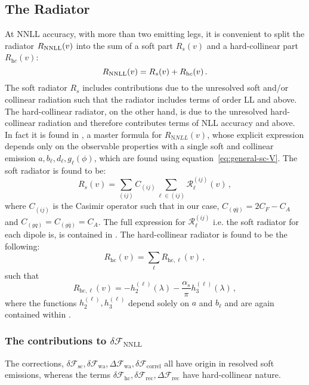 \subsection{The Radiator}
\label{sec: radiator}
At NNLL accuracy, with more than two emitting legs, it is convenient
to split the radiator $R_{\text{NNLL}}(v)$ into the sum of a soft part $R_s(v)$ and a hard-collinear part $R_{\mathrm hc}(v)$:
\begin{equation}
  \label{eq:nnll-radiator}
  R_{\text{NNLL}}(v) = R_s(v)+R_{\mathrm hc}(v)\,.
\end{equation}
The soft radiator $R_s$ includes contributions due to the unresolved soft and/or collinear radiation such that the radiator includes terms of order LL and above. The hard-collinear radiator, on the other hand, is due to the unresolved hard-collinear radiation and therefore contributes terms of NLL accuracy and above. In fact it is found in \cite{Arpino:2019ozn}, a master formula for  $R_{\mathrm NNLL}(v)$, whose explicit expression depends only on the observable properties with a single soft and collinear emission $a,b_\ell,d_\ell,g_\ell(\phi)$, which are found using equation~\ref{eq:general-sc-V}. The soft radiator is found to be:
\begin{equation}
R_s(v)=\sum_{(ij)}C_{(ij)}\sum_{\ell\in(ij)}\mathcal{R}_{\ell}^{(ij)}(v)\,,
\label{eq:soft-radiator}
\end{equation}
where $C_{(ij)}$ is the Casimir operator 
such that in our case, $C_{(q\bar{q})}=2C_F-C_A$ and $C_{(gq)}=C_{(g\bar{q})}=C_A$. The full expression for $\mathcal{R}_{\ell}^{(ij)}$ i.e. the soft radiator for each dipole is, is contained in \cite{Arpino:2019ozn}.
The hard-collinear radiator is found to be the following:
\begin{equation}
	R_{\mathrm{hc}}(v)=\sum_{\ell}R_{\mathrm{hc},\ell}(v)\,,
	\label{eq:radiator-hc}
\end{equation}
such that
\begin{equation}
	R_{\mathrm{hc},\ell}(v)=-h_2^{(\ell)}(\lambda)-\frac{\alpha_s}{\pi}h_3^{(\ell)}(\lambda)\,,
	\label{eq:radiator-hc-more}
\end{equation}
where the functions $h_2^{(\ell)}, h_3^{(\ell)}$ depend solely on $a$ and $b_{\ell}$ and are again contained within \cite{Arpino:2019ozn}.

\subsubsection{The contributions to $\delta\mathcal{F}_{\mathrm{NNLL}}$}
The corrections, $\delta\mathcal{F}_{\mathrm{sc}}, \delta\mathcal{F}_{\mathrm{wa}}, \Delta\mathcal{F}_{\mathrm{wa}}, \delta\mathcal{F}_{\mathrm{correl}}$ all have origin in resolved soft emissions, whereas the terms $\delta\mathcal{F}_{\mathrm{hc}}, \delta\mathcal{F}_{\mathrm{rec}}, \Delta\mathcal{F}_{\mathrm{rec}}$ have hard-collinear nature. 

